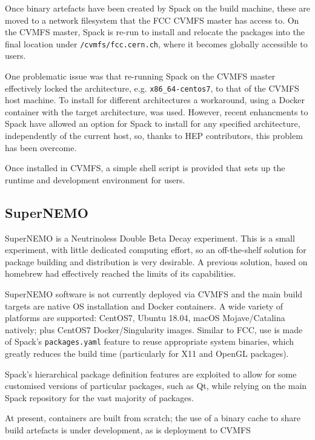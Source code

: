 \documentclass{webofc}
\begin{document}
Once binary artefacts have been created by Spack on the build machine,
these are moved to a network filesystem that the FCC CVMFS\cite{CVMFS} master
has access to. On the CVMFS master, Spack is re-run to install and relocate
the packages into the final location under \texttt{/cvmfs/fcc.cern.ch}, where
it becomes globally accessible to users.

One problematic issue was that re-running Spack on the CVMFS master effectively
locked the architecture, e.g. \texttt{x86\_64-centos7}, to that of the CVMFS
host machine. To install for different architectures a workaround, using a
Docker container with the target architecture, was used. However, recent
enhancments to Spack have allowed an option for Spack to install for any
specified architecture, independently of the current host, so, thanks to HEP
contributors, this problem has been overcome.

Once installed in CVMFS, a simple shell script is provided that sets up the
runtime and development environment for users.

\subsection{SuperNEMO}
\label{supernemo}

SuperNEMO\cite{Piquemal2006} is a Neutrinoless Double Beta Decay experiment.
This is a small experiment, with little dedicated computing effort, so
an off-the-shelf solution for package building and distribution is very 
desirable. A previous solution, based on homebrew\cite{homebrew} had effectively
reached the limits of its capabilities.

SuperNEMO software is not currently deployed via CVMFS and the main build targets are
native OS installation and Docker containers. A wide variety of platforms are
supported: CentOS7, Ubuntu 18.04, macOS Mojave/Catalina natively; plus CentOS7
Docker/Singularity images. Similar to FCC, use is made of Spack's
\texttt{packages.yaml} feature to reuse appropriate system binaries, which greatly
reduces the build time (particularly for X11 and OpenGL packages).

Spack's hierarchical package definition features are exploited to allow for
some customised versions of particular packages, such as Qt, while relying on
the main Spack repository for the vast majority of packages.

At present, containers are built from scratch; the use of a binary cache to
share build artefacts is under development, as is deployment to CVMFS
\end{document}
